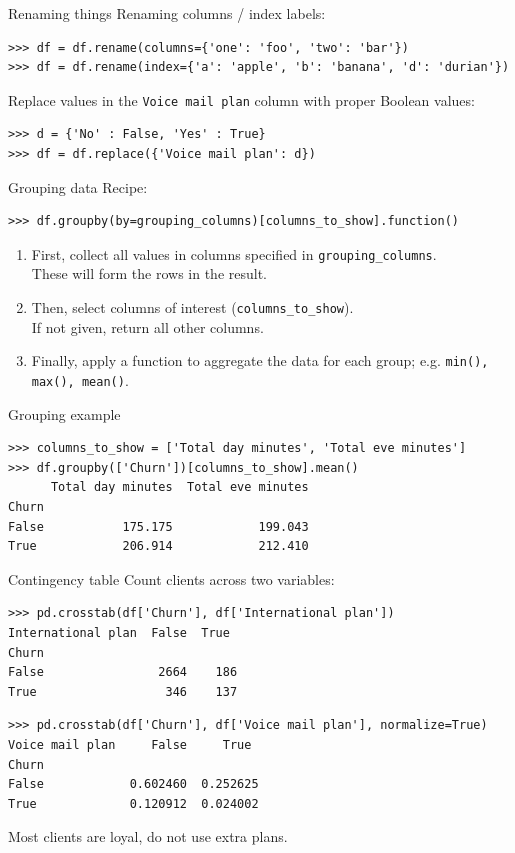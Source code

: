 \documentclass[aspectratio=169,usenames,dvipsnames]{beamer}
\begin{document}
\begin{frame}[fragile]{Renaming things}
Renaming columns / index labels:
\begin{lstlisting}
>>> df = df.rename(columns={'one': 'foo', 'two': 'bar'})
>>> df = df.rename(index={'a': 'apple', 'b': 'banana', 'd': 'durian'})
\end{lstlisting}

Replace values in the \texttt{Voice mail plan} column with proper Boolean values:
\begin{lstlisting}
>>> d = {'No' : False, 'Yes' : True}
>>> df = df.replace({'Voice mail plan': d})
\end{lstlisting}

\end{frame}


\begin{frame}[fragile]{Grouping data}
Recipe:
\begin{lstlisting}
>>> df.groupby(by=grouping_columns)[columns_to_show].function()
\end{lstlisting}

\begin{enumerate}
\item First, collect all values in columns specified
    in \texttt{grouping\_columns}. \\
    These will form the rows in the result.
\item Then, select columns of interest (\texttt{columns\_to\_show}). \\
    If not given, return all other columns.
\item Finally, apply a function to aggregate the data for each group;
    e.g. \texttt{min(), max(), mean()}.
\end{enumerate}
\end{frame}


\begin{frame}[fragile]{Grouping example}
\begin{lstlisting}
>>> columns_to_show = ['Total day minutes', 'Total eve minutes']
>>> df.groupby(['Churn'])[columns_to_show].mean()
      Total day minutes  Total eve minutes
Churn
False           175.175            199.043
True            206.914            212.410
\end{lstlisting}
\end{frame}

\begin{frame}[fragile]{Contingency table}
Count clients across two variables:
\begin{lstlisting}
>>> pd.crosstab(df['Churn'], df['International plan'])
International plan  False  True
Churn
False                2664    186
True                  346    137
\end{lstlisting}
\pause
\begin{lstlisting}
>>> pd.crosstab(df['Churn'], df['Voice mail plan'], normalize=True)
Voice mail plan     False     True
Churn
False            0.602460  0.252625
True             0.120912  0.024002
\end{lstlisting}

Most clients are loyal, do not use extra plans.
\end{frame}
\end{document}
